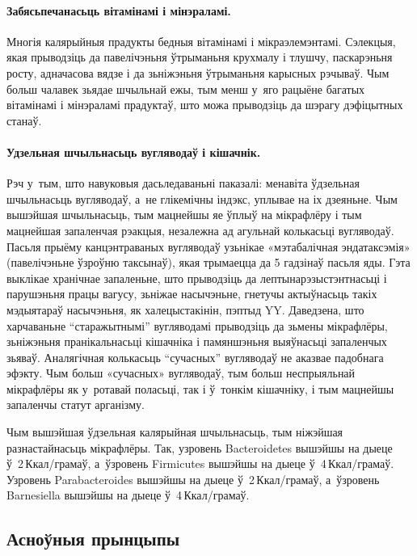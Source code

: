 \paragraph{Забясьпечанасьць вітамінамі і мінэраламі.}
Многія калярыйныя прадукты бедныя вітамінамі і мікраэлемэнтамі. Сэлекцыя, якая прыводзіць да павелічэньня ўтрыманьня крухмалу і тлушчу, паскарэньня росту, адначасова вядзе і да зьніжэньня ўтрыманьня карысных рэчываў. Чым больш чалавек зьядае шчыльнай ежы, тым менш у~яго рацыёне багатых вітамінамі і мінэраламі прадуктаў, што можа прыводзіць да шэрагу дэфіцытных станаў.


\paragraph{Удзельная шчыльнасьць вугляводаў і кішачнік.}
Рэч у~тым, што навуковыя дасьледаваньні паказалі: менавіта ўдзельная шчыльнасьць вугляводаў, а~не глікемічны індэкс, уплывае на іх дзеяньне. Чым вышэйшая шчыльнасьць, тым мацнейшы яе ўплыў на мікрафлёру і тым мацнейшая запаленчая рэакцыя, незалежна ад агульнай колькасьці вугляводаў. Пасьля прыёму канцэнтраваных вугляводаў узьнікае «мэтабалічная эндатаксэмія» (павелічэньне ўзроўню таксынаў), якая трымаецца да 5 гадзінаў пасьля яды. Гэта выклікае хранічнае запаленьне, што прыводзіць да лептынарэзыстэнтнасьці і парушэньня працы вагусу, зьніжае насычэньне, гнетучы актыўнасьць такіх мэдыятараў насычэньня, як халецыстакінін, пэптыд YY. Даведзена, што харчаваньне ``старажытнымі'' вугляводамі прыводзіць да зьмены мікрафлёры, зьніжэньня пранікальнасьці кішачніка і памяншэньня выяўнасьці запаленчых зьяваў. Аналягічная колькасьць ``сучасных'' вугляводаў не аказвае падобнага эфэкту. Чым больш «сучасных» вугляводаў, тым больш неспрыяльнай мікрафлёры як у~ротавай поласьці, так і ў~тонкім кішачніку, і тым мацнейшы запаленчы статут арганізму.

Чым вышэйшая ўдзельная калярыйная шчыльнасьць, тым ніжэйшая разнастайнасьць мікрафлёры. Так, узровень Bacteroidetes вышэйшы на дыеце ў~2\,Ккал/грамаў, а~ўзровень Firmicutes вышэйшы на дыеце ў~4\,Ккал/грамаў. Узровень Parabacteroides вышэйшы на дыеце ў~2\,Ккал/грамаў, а~ўзровень Barnesiella вышэйшы на дыеце ў~4\,Ккал/грамаў.

\subsection{Асноўныя прынцыпы}

